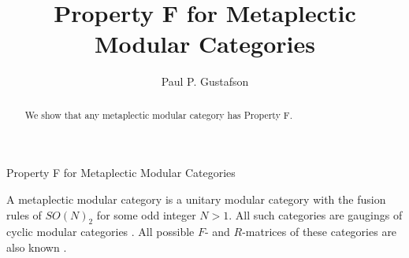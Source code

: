 \documentclass{amsart}
\begin{document}
{Property F for Metaplectic Modular Categories}


\title{Property F for Metaplectic Modular Categories}

\author{Paul P. Gustafson}
\address{Department of Mathematics,
    Texas A\&M University,
    College Station, TX
    U.S.A.}

\maketitle

\begin{abstract}
We show that any metaplectic modular category has Property F.


\end{abstract}

A metaplectic modular category is a unitary modular category with the fusion rules of $SO(N)_2$ for some odd integer $N > 1$.  All such categories are gaugings of cyclic modular categories \cite{metaClass1}.  All possible  $F$- and $R$-matrices of these categories are also known \cite{metaClass2}.  
\end{document}

